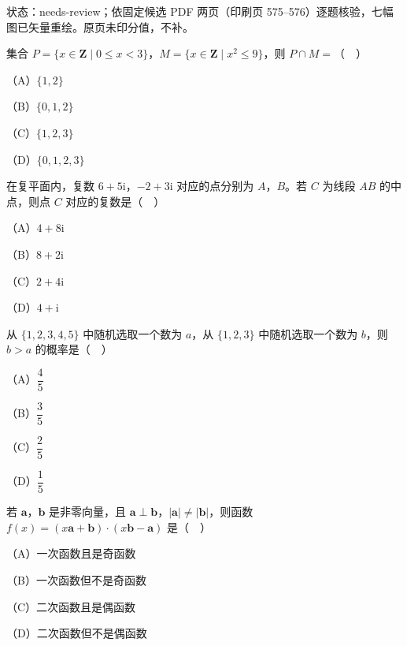 

状态：needs-review；依固定候选 PDF 两页（印刷页 575–576）逐题核验，七幅图已矢量重绘。原页未印分值，不补。


\begin{question}
集合 $P=\{x\in\mathbf Z\mid0\leqslant x<3\}$，$M=\{x\in\mathbf Z\mid x^2\leqslant9\}$，则 $P\cap M=$（　）

（A）$\{1,2\}$

（B）$\{0,1,2\}$

（C）$\{1,2,3\}$

（D）$\{0,1,2,3\}$

\end{question}
\begin{question}
在复平面内，复数 $6+5\mathrm i$，$-2+3\mathrm i$ 对应的点分别为 $A$，$B$。若 $C$ 为线段 $AB$ 的中点，则点 $C$ 对应的复数是（　）

（A）$4+8\mathrm i$

（B）$8+2\mathrm i$

（C）$2+4\mathrm i$

（D）$4+\mathrm i$

\end{question}
\begin{question}
从 $\{1,2,3,4,5\}$ 中随机选取一个数为 $a$，从 $\{1,2,3\}$ 中随机选取一个数为 $b$，则 $b>a$ 的概率是（　）

（A）$\dfrac45$

（B）$\dfrac35$

（C）$\dfrac25$

（D）$\dfrac15$

\end{question}
\begin{question}
若 $\boldsymbol a$，$\boldsymbol b$ 是非零向量，且 $\boldsymbol a\perp\boldsymbol b$，$|\boldsymbol a|\neq|\boldsymbol b|$，则函数 $f(x)=(x\boldsymbol a+\boldsymbol b)\cdot(x\boldsymbol b-\boldsymbol a)$ 是（　）

（A）一次函数且是奇函数

（B）一次函数但不是奇函数

（C）二次函数且是偶函数

（D）二次函数但不是偶函数

\Needspace{0.4\textheight}
\end{question}
